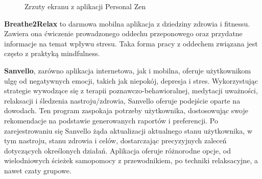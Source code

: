 \begin{figure}[h]
{{        } }
    \caption{Zrzuty ekranu z aplikacji Personal Zen}
\end{figure}

\textbf{Breathe2Relax} to darmowa mobilna aplikacja z dziedziny zdrowia i
fitnessu. Zawiera ona ćwiczenie prowadzonego oddechu przeponowego oraz przydatne
informacje na temat wpływu stresu.  Taka forma pracy z oddechem związana jest
często z praktyką mindfulness.

\textbf{Sanvello}, zarówno aplikacja internetowa, jak i mobilna, oferuje
użytkownikom ulgę od negatywnych emocji, takich jak niepokój, depresja i stres.
Wykorzystując strategie wywodzące się z terapii poznawczo-behawioralnej,
medytacji uważności, relaksacji i śledzenia nastroju/zdrowia, Sanvello oferuje
podejście oparte na dowodach. Ten program zaspokaja potrzeby użytkownika,
dostosowując swoje rekomendacje na podstawie generowanych raportów i
preferencji. Po zarejestrowaniu się Sanvello żąda aktualizacji aktualnego stanu
użytkownika, w tym nastroju, stanu zdrowia i celów, dostarczając precyzyjnych
zaleceń dotyczących określonych działań. Aplikacja oferuje różnorodne opcje, od
wielodniowych ścieżek samopomocy z przewodnikiem, po techniki relaksacyjne, a
nawet czaty grupowe.

